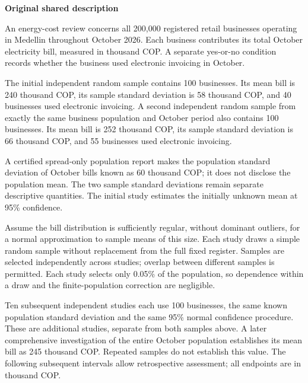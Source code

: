 \secInicio

\clearpage


\textbf{Original shared description}

An energy-cost review concerns all 200,000 registered retail businesses operating in Medellin throughout October 2026. Each business contributes its total October electricity bill, measured in thousand COP. A separate yes-or-no condition records whether the business used electronic invoicing in October.

The initial independent random sample contains 100 businesses. Its mean bill is 240 thousand COP, its sample standard deviation is 58 thousand COP, and 40 businesses used electronic invoicing. A second independent random sample from exactly the same business population and October period also contains 100 businesses. Its mean bill is 252 thousand COP, its sample standard deviation is 66 thousand COP, and 55 businesses used electronic invoicing.

A certified spread-only population report makes the population standard deviation of October bills known as 60 thousand COP; it does not disclose the population mean. The two sample standard deviations remain separate descriptive quantities. The initial study estimates the initially unknown mean at 95\% confidence.

Assume the bill distribution is sufficiently regular, without dominant outliers, for a normal approximation to sample means of this size. Each study draws a simple random sample without replacement from the full fixed register. Samples are selected independently across studies; overlap between different samples is permitted. Each study selects only 0.05\% of the population, so dependence within a draw and the finite-population correction are negligible.

Ten subsequent independent studies each use 100 businesses, the same known population standard deviation and the same 95\% normal confidence procedure. These are additional studies, separate from both samples above. A later comprehensive investigation of the entire October population establishes its mean bill as 245 thousand COP. Repeated samples do not establish this value. The following subsequent intervals allow retrospective assessment; all endpoints are in thousand COP.

